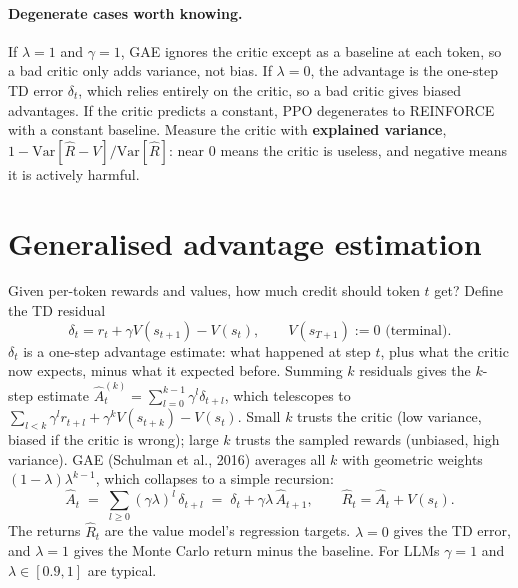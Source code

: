 \paragraph{Degenerate cases worth knowing.} If $\lambda=1$ and $\gamma=1$, GAE ignores the critic
except as a baseline at each token, so a bad critic only adds variance, not bias. If $\lambda=0$, the
advantage is the one-step TD error $\delta_t$, which relies entirely on the critic, so a bad critic
gives biased advantages. If the critic predicts a constant, PPO degenerates to REINFORCE with a
constant baseline. Measure the critic with \textbf{explained variance},
$1-\mathrm{Var}[\hat R-V]/\mathrm{Var}[\hat R]$: near 0 means the critic is useless, and negative means it
is actively harmful.

\section{Generalised advantage estimation}\label{sec:rlhf:gae}

Given per-token rewards and values, how much credit should token $t$ get? Define the TD residual
\begin{equation}
  \delta_t = r_t + \gamma V(s_{t+1}) - V(s_t), \qquad V(s_{T+1}) := 0 \text{ (terminal)}.
\end{equation}
$\delta_t$ is a one-step advantage estimate: what happened at step $t$, plus what the critic now
expects, minus what it expected before. Summing $k$ residuals gives the $k$-step estimate
$\hat A^{(k)}_t = \sum_{l=0}^{k-1}\gamma^l\delta_{t+l}$, which telescopes to
$\sum_{l<k}\gamma^l r_{t+l} + \gamma^k V(s_{t+k}) - V(s_t)$. Small $k$ trusts the critic (low
variance, biased if the critic is wrong); large $k$ trusts the sampled rewards (unbiased, high
variance). GAE (Schulman et al., 2016) averages all $k$ with geometric weights $(1-\lambda)\lambda^{k-1}$,
which collapses to a simple recursion:
\begin{equation}
  \hat A_t \;=\; \sum_{l\ge0} (\gamma\lambda)^l\,\delta_{t+l}
  \;=\; \delta_t + \gamma\lambda\,\hat A_{t+1},
  \qquad \hat R_t = \hat A_t + V(s_t).
  \label{eq:rlhf:gae}
\end{equation}
The returns $\hat R_t$ are the value model's regression targets. $\lambda=0$ gives the TD error, and
$\lambda=1$ gives the Monte Carlo return minus the baseline. For LLMs $\gamma=1$ and
$\lambda\in[0.9,1]$ are typical.

